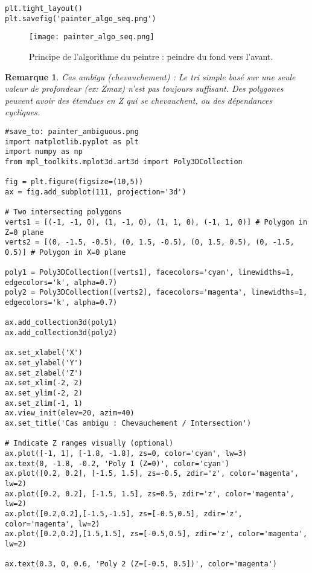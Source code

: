 \documentclass{article}
\newtheorem{remark}{Remarque}
\begin{document}
{\begin{verbatim}
plt.tight_layout()
plt.savefig('painter_algo_seq.png')
\end{verbatim}

\begin{figure}[H]
\centering
\texttt{[image: painter\_algo\_seq.png]}
\caption{Principe de l'algorithme du peintre : peindre du fond vers l'avant.}
\label{fig:painter_algo_seq}
\end{figure}

\begin{remark}
Cas ambigu (chevauchement) : Le tri simple basé sur une seule valeur de profondeur (ex: Zmax) n'est pas toujours suffisant. Des polygones peuvent avoir des étendues en Z qui se chevauchent, ou des dépendances cycliques.
\end{remark}

\begin{verbatim}
#save_to: painter_ambiguous.png
import matplotlib.pyplot as plt
import numpy as np
from mpl_toolkits.mplot3d.art3d import Poly3DCollection

fig = plt.figure(figsize=(10,5))
ax = fig.add_subplot(111, projection='3d')

# Two intersecting polygons
verts1 = [(-1, -1, 0), (1, -1, 0), (1, 1, 0), (-1, 1, 0)] # Polygon in Z=0 plane
verts2 = [(0, -1.5, -0.5), (0, 1.5, -0.5), (0, 1.5, 0.5), (0, -1.5, 0.5)] # Polygon in X=0 plane

poly1 = Poly3DCollection([verts1], facecolors='cyan', linewidths=1, edgecolors='k', alpha=0.7)
poly2 = Poly3DCollection([verts2], facecolors='magenta', linewidths=1, edgecolors='k', alpha=0.7)

ax.add_collection3d(poly1)
ax.add_collection3d(poly2)

ax.set_xlabel('X')
ax.set_ylabel('Y')
ax.set_zlabel('Z')
ax.set_xlim(-2, 2)
ax.set_ylim(-2, 2)
ax.set_zlim(-1, 1)
ax.view_init(elev=20, azim=40)
ax.set_title('Cas ambigu : Chevauchement / Intersection')

# Indicate Z ranges visually (optional)
ax.plot([-1, 1], [-1.8, -1.8], zs=0, color='cyan', lw=3)
ax.text(0, -1.8, -0.2, 'Poly 1 (Z=0)', color='cyan')
ax.plot([0.2, 0.2], [-1.5, 1.5], zs=-0.5, zdir='z', color='magenta', lw=2)
ax.plot([0.2, 0.2], [-1.5, 1.5], zs=0.5, zdir='z', color='magenta', lw=2)
ax.plot([0.2,0.2],[-1.5,-1.5], zs=[-0.5,0.5], zdir='z', color='magenta', lw=2)
ax.plot([0.2,0.2],[1.5,1.5], zs=[-0.5,0.5], zdir='z', color='magenta', lw=2)

ax.text(0.3, 0, 0.6, 'Poly 2 (Z=[-0.5, 0.5])', color='magenta')



\end{verbatim}}
\end{document}
